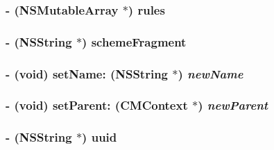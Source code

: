 \hypertarget{interface_c_m_context_3172da5bae6fbeb71d260b18140df650}{
\subsubsection[rules]{\setlength{\rightskip}{0pt plus 5cm}- (NSMutableArray $\ast$) {\bf rules} }}
\label{interface_c_m_context_3172da5bae6fbeb71d260b18140df650}


\hypertarget{interface_c_m_context_1341d62c2d2eee6cfb60a44a5cbafd8d}{
\subsubsection[schemeFragment]{\setlength{\rightskip}{0pt plus 5cm}- ({\bf NSString} $\ast$) schemeFragment }}
\label{interface_c_m_context_1341d62c2d2eee6cfb60a44a5cbafd8d}


\hypertarget{interface_c_m_context_582070ae69c46783271f513aff1f74e7}{
\subsubsection[setName:]{\setlength{\rightskip}{0pt plus 5cm}- (void) setName: ({\bf NSString} $\ast$) {\em newName}}}
\label{interface_c_m_context_582070ae69c46783271f513aff1f74e7}


\hypertarget{interface_c_m_context_61e3e9525bfb5c4beeb9c9c9f07b7f3d}{
\subsubsection[setParent:]{\setlength{\rightskip}{0pt plus 5cm}- (void) setParent: ({\bf CMContext} $\ast$) {\em newParent}}}
\label{interface_c_m_context_61e3e9525bfb5c4beeb9c9c9f07b7f3d}


\hypertarget{interface_c_m_context_a3920f2822db39752c950c0606cad3a5}{
\subsubsection[uuid]{\setlength{\rightskip}{0pt plus 5cm}- ({\bf NSString} $\ast$) {\bf uuid} }}
\label{interface_c_m_context_a3920f2822db39752c950c0606cad3a5}




